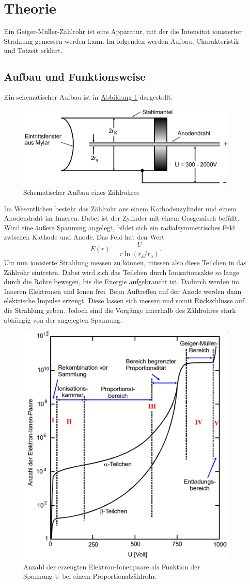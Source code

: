 \section{Theorie}
\label{sec:Theorie}


Ein Geiger-Müller-Zählrohr ist eine Apparatur, mit der die Intensität ionisierter Strahlung gemessen werden kann.
Im folgenden werden Aufbau, Charakteristik und Totzeit erklärt.
\subsection{Aufbau und Funktionsweise}
Ein schematischer Aufbau ist in \hyperref[fig:Aufbau1]{Abbildung \ref{fig:Aufbau1}} dargestellt.
\begin{figure} [H]
    \center
    \caption{Schematischer Aufbau eines Zählrohres}\label{fig:Aufbau1}
    \includegraphics[width=0.7\linewidth]{pictures/Aufbau1.pdf}
\end{figure}
Im Wesentlichen besteht das Zählrohr aus einem Kathodenzylinder und einem Anodendraht im Inneren.
Dabei ist der Zylinder mit einem Gasgemisch befüllt.
Wird eine äußere Spannung angelegt, bildet sich ein radialsymmetrisches Feld zwischen Kathode und Anode.
Das Feld hat den Wert
\begin{equation}
    E(r)=\frac{U}{r \ln \left(r_{k} / r_{a}\right)}.
\end{equation}
Um nun ionisierte Strahlung messen zu können, müssen also diese Teilchen in das Zählrohr eintreten.
Dabei wird sich das Teilchen durch Ionisationsakte so lange durch die Röhre bewegen, bis die Energie aufgebraucht ist.
Dadurch werden im Inneren Elektronen und Ionen frei. Beim Auftreffen auf der Anode werden dann elektrische Impulse erzeugt.
Diese lassen sich messen und somit Rückschlüsse auf die Strahlung geben.
Jedoch sind die Vorgänge innerhalb des Zählrohres stark abhängig von der angelegten Spannung.
\begin{figure}
    \center
    \includegraphics[width=0.5\linewidth]{pictures/Diagramm1.pdf}
    \caption{Anzahl der erzeugten Elektron-Ionenpaare als Funktion der Spannung U bei einem Proportionalzählrohr.}\label{fig:Diagramm1}
\end{figure}
